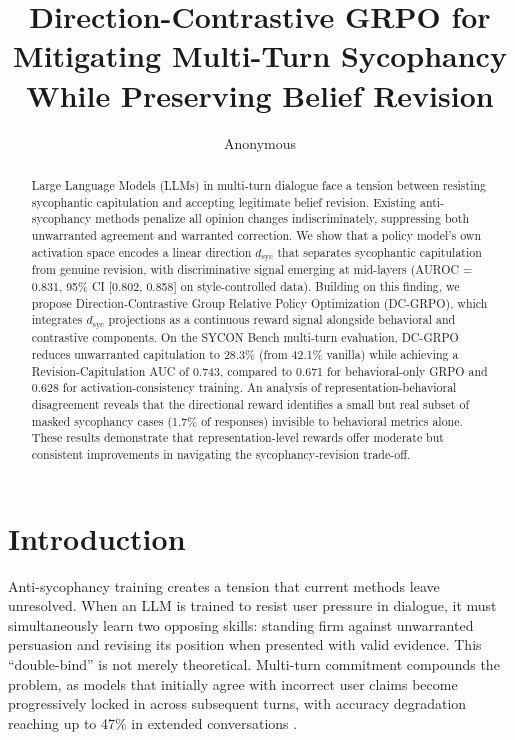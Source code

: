 \documentclass[11pt,a4paper]{article}
\title{Direction-Contrastive GRPO for Mitigating Multi-Turn Sycophancy\\While Preserving Belief Revision}
\author{Anonymous}
\newcommand{\dsyc}{$d_{\mathrm{syc}}$}
\begin{document}
\maketitle

\begin{abstract}
Large Language Models (LLMs) in multi-turn dialogue face a tension between resisting sycophantic capitulation and accepting legitimate belief revision. Existing anti-sycophancy methods penalize all opinion changes indiscriminately, suppressing both unwarranted agreement and warranted correction. We show that a policy model's own activation space encodes a linear direction \dsyc{} that separates sycophantic capitulation from genuine revision, with discriminative signal emerging at mid-layers (AUROC = 0.831, 95\% CI [0.802, 0.858] on style-controlled data). Building on this finding, we propose Direction-Contrastive Group Relative Policy Optimization (DC-GRPO), which integrates \dsyc{} projections as a continuous reward signal alongside behavioral and contrastive components. On the SYCON Bench multi-turn evaluation, DC-GRPO reduces unwarranted capitulation to 28.3\% (from 42.1\% vanilla) while achieving a Revision-Capitulation AUC of 0.743, compared to 0.671 for behavioral-only GRPO and 0.628 for activation-consistency training. An analysis of representation-behavioral disagreement reveals that the directional reward identifies a small but real subset of masked sycophancy cases (1.7\% of responses) invisible to behavioral metrics alone. These results demonstrate that representation-level rewards offer moderate but consistent improvements in navigating the sycophancy-revision trade-off.
\end{abstract}

\section{Introduction}

Anti-sycophancy training creates a tension that current methods leave unresolved. When an LLM is trained to resist user pressure in dialogue, it must simultaneously learn two opposing skills: standing firm against unwarranted persuasion and revising its position when presented with valid evidence. This ``double-bind'' is not merely theoretical. Multi-turn commitment compounds the problem, as models that initially agree with incorrect user claims become progressively locked in across subsequent turns, with accuracy degradation reaching up to 47\% in extended conversations \cite{truthdecay}.
\end{document}
